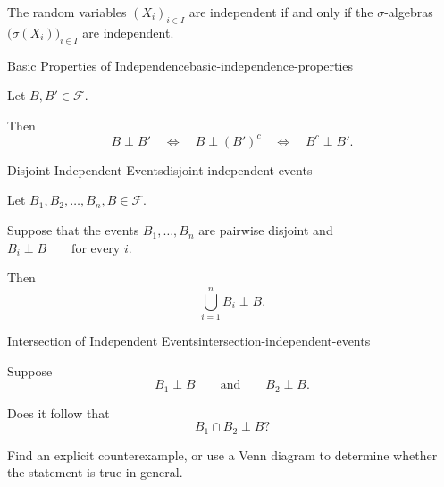 \begin{observation}

The random variables $(X_i)_{i\in I}$ are independent if and only if
the $\sigma$-algebras
\(
    \bigl(\sigma(X_i)\bigr)_{i\in I}
\)
are independent.

\end{observation}


\begin{proposition}{Basic Properties of Independence}{basic-independence-properties}

Let $B,B'\in\mathcal{F}$.

Then
\[
    B\perp B'
    \quad\Longleftrightarrow\quad
    B\perp (B')^c
    \quad\Longleftrightarrow\quad
    B^c\perp B'.
\]

\end{proposition}

\begin{proposition}{Disjoint Independent Events}{disjoint-independent-events}

Let
\(
    B_1,B_2,\ldots,B_n,B\in\mathcal{F}.
\)

Suppose that the events $B_1,\ldots,B_n$ are pairwise disjoint and
\(
    B_i\perp B
    \qquad\text{for every }i.
\)

Then
\[
    \bigcup_{i=1}^{n}B_i
    \perp B.
\]

\end{proposition}


\begin{question}{Intersection of Independent Events}{intersection-independent-events}

Suppose
\[
    B_1\perp B
    \qquad\text{and}\qquad
    B_2\perp B.
\]

Does it follow that
\[
    B_1\cap B_2\perp B?
\]

\begin{todo}
Find an explicit counterexample, or use a Venn diagram to determine
whether the statement is true in general.
\end{todo}

\end{question}


